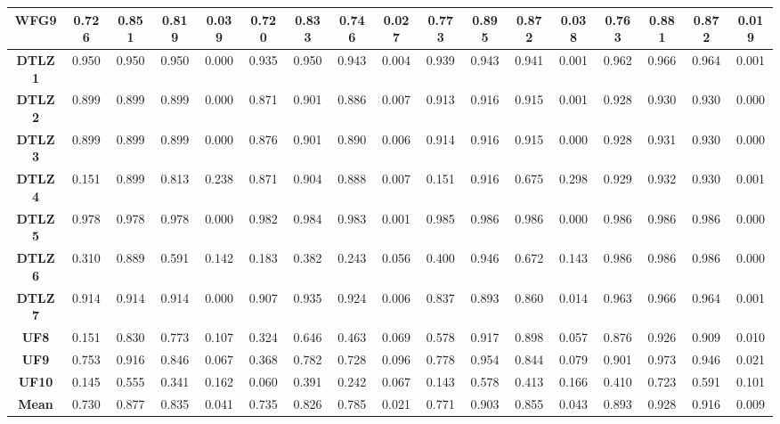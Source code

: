 \begin{table*}[]
\begin{scriptsize}
\begin{tabular}{c c|c|c|c|c|c|c|c|c|c|c|c|c|c|c|c}
\multicolumn{1}{c|}{\textbf{WFG9}} & 0.726 & 0.851 & 0.819 & 0.039 & 0.720 & 0.833 & 0.746 & 0.027 & 0.773 & 0.895 & 0.872 & 0.038 & 0.763 & 0.881 & 0.872 & 0.019 \\ \hline
\multicolumn{1}{c|}{\textbf{DTLZ1}} & 0.950 & 0.950 & 0.950 & 0.000 & 0.935 & 0.950 & 0.943 & 0.004 & 0.939 & 0.943 & 0.941 & 0.001 & 0.962 & 0.966 & 0.964 & 0.001 \\ \hline
\multicolumn{1}{c|}{\textbf{DTLZ2}} & 0.899 & 0.899 & 0.899 & 0.000 & 0.871 & 0.901 & 0.886 & 0.007 & 0.913 & 0.916 & 0.915 & 0.001 & 0.928 & 0.930 & 0.930 & 0.000 \\ \hline
\multicolumn{1}{c|}{\textbf{DTLZ3}} & 0.899 & 0.899 & 0.899 & 0.000 & 0.876 & 0.901 & 0.890 & 0.006 & 0.914 & 0.916 & 0.915 & 0.000 & 0.928 & 0.931 & 0.930 & 0.000 \\ \hline
\multicolumn{1}{c|}{\textbf{DTLZ4}} & 0.151 & 0.899 & 0.813 & 0.238 & 0.871 & 0.904 & 0.888 & 0.007 & 0.151 & 0.916 & 0.675 & 0.298 & 0.929 & 0.932 & 0.930 & 0.001 \\ \hline
\multicolumn{1}{c|}{\textbf{DTLZ5}} & 0.978 & 0.978 & 0.978 & 0.000 & 0.982 & 0.984 & 0.983 & 0.001 & 0.985 & 0.986 & 0.986 & 0.000 & 0.986 & 0.986 & 0.986 & 0.000 \\ \hline
\multicolumn{1}{c|}{\textbf{DTLZ6}} & 0.310 & 0.889 & 0.591 & 0.142 & 0.183 & 0.382 & 0.243 & 0.056 & 0.400 & 0.946 & 0.672 & 0.143 & 0.986 & 0.986 & 0.986 & 0.000 \\ \hline
\multicolumn{1}{c|}{\textbf{DTLZ7}} & 0.914 & 0.914 & 0.914 & 0.000 & 0.907 & 0.935 & 0.924 & 0.006 & 0.837 & 0.893 & 0.860 & 0.014 & 0.963 & 0.966 & 0.964 & 0.001 \\ \hline
\multicolumn{1}{c|}{\textbf{UF8}} & 0.151 & 0.830 & 0.773 & 0.107 & 0.324 & 0.646 & 0.463 & 0.069 & 0.578 & 0.917 & 0.898 & 0.057 & 0.876 & 0.926 & 0.909 & 0.010 \\ \hline
\multicolumn{1}{c|}{\textbf{UF9}} & 0.753 & 0.916 & 0.846 & 0.067 & 0.368 & 0.782 & 0.728 & 0.096 & 0.778 & 0.954 & 0.844 & 0.079 & 0.901 & 0.973 & 0.946 & 0.021 \\ \hline
\multicolumn{1}{c|}{\textbf{UF10}} & 0.145 & 0.555 & 0.341 & 0.162 & 0.060 & 0.391 & 0.242 & 0.067 & 0.143 & 0.578 & 0.413 & 0.166 & 0.410 & 0.723 & 0.591 & 0.101 \\ \hline
\multicolumn{1}{c|}{\textbf{Mean}} & 0.730 & 0.877 & 0.835 & 0.041 & 0.735 & 0.826 & 0.785 & 0.021 & 0.771 & 0.903 & 0.855 & 0.043 & 0.893 & 0.928 & 0.916 & 0.009 \\ \hline
\end{tabular}%
\end{scriptsize}
\end{table*}

